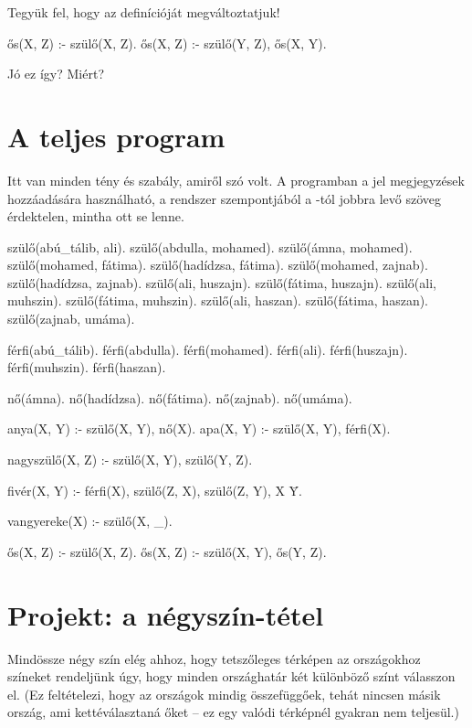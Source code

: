 \begin{problem}
Tegyük fel, hogy az  definícióját
megváltoztatjuk!
\begin{program}
ős(X, Z) :- szülő(X, Z).
ős(X, Z) :- szülő(Y, Z), ős(X, Y).
\end{program}
Jó ez így? Miért?
\end{problem}

\section*{A teljes program}

Itt van minden tény és szabály, amiről szó volt. A
programban a \pr{\%} jel megjegyzések hozzáadására
használható, a rendszer szempontjából a \pr{\%}-tól
jobbra levő szöveg érdektelen, mintha ott se
lenne.

\begin{program}
szülő(abú_tálib, ali).
szülő(abdulla, mohamed).
szülő(ámna, mohamed).
szülő(mohamed, fátima).
szülő(hadídzsa, fátima).
szülő(mohamed, zajnab).
szülő(hadídzsa, zajnab).
szülő(ali, huszajn).
szülő(fátima, huszajn).
szülő(ali, muhszin).
szülő(fátima, muhszin).
szülő(ali, haszan).
szülő(fátima, haszan).
szülő(zajnab, umáma).

férfi(abú_tálib).
férfi(abdulla).
férfi(mohamed).
férfi(ali).
férfi(huszajn).
férfi(muhszin).
férfi(haszan).

nő(ámna).
nő(hadídzsa).
nő(fátima).
nő(zajnab).
nő(umáma).

anya(X, Y) :- szülő(X, Y), nő(X).   %
apa(X, Y) :- szülő(X, Y), férfi(X). %

nagyszülő(X, Z) :- szülő(X, Y), szülő(Y, Z).

fivér(X, Y) :-
    férfi(X),
    szülő(Z, X), szülő(Z, Y),
    X \= Y.

vangyereke(X) :- szülő(X, _).

ős(X, Z) :- szülő(X, Z).
ős(X, Z) :- szülő(X, Y), ős(Y, Z).
\end{program}

\clearpage

\section{Projekt: a négyszín-tétel}
Mindössze négy szín elég ahhoz, hogy tetszőleges
térképen az országokhoz színeket rendeljünk úgy,
hogy minden országhatár két különböző színt
válasszon el. (Ez feltételezi, hogy az országok
mindig összefüggőek, tehát nincsen másik ország, ami
kettéválasztaná őket -- ez egy valódi térképnél
gyakran nem teljesül.)

